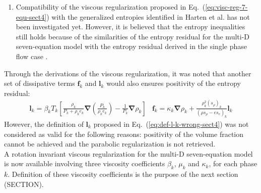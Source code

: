 \documentclass[preprint,10pt]{elsarticle}
\newcommand{\grad}{\mbold{\nabla}}
\newcommand{\mbold}[1]{\boldsymbol#1}
\newcommand{\eqt}[1]{Eq.~(\ref{#1})}                     %
\newcommand{\tcr}[1]{\textcolor{red}{#1}}
\newcommand{\tcb}[1]{\textcolor{blue}{#1}}
\begin{document}
\begin{enumerate}
\item{Compatibility of the viscous regularization proposed in \eqt{eq:visc-reg-7-equ-sect4} with the generalized entropies identified in Harten et al. \cite{Harten} has not been investigated yet. However, it is believed that the entropy inequalities still holds because of the similarities of the entropy residual for the multi-D seven-equation model with the entropy residual derived in the single phase flow case \cite{jlg}.} 
\end{enumerate}
%
Through the derivations of the viscous regularization, it was noted that another set of dissipative terms $\mbold f_k$ and $\mbold l_k$ would also ensures positivity of the entropy residual:
%
\begin{subequations}
\begin{align}\label{eq:def-l-k-wrong-sect4}
\mbold l_k =\beta_k T_k \left[ \frac{\rho_k}{P_k+\rho_k e_k} \grad \left( \frac{P_k}{\rho_k e_k} \right) - \frac{1}{P_k} \grad \rho_k \right]
\end{align}
\begin{align}
\mbold f_k = \kappa_k \grad \rho_k +  \frac{\rho^2_k (s_{\rho})_k}{\left( \rho s_{\rho} - e s_e \right)_k} \mbold l_k
\end{align}
\end{subequations}
%
However, the definition of $\mbold l_k$ proposed in \eqt{eq:def-l-k-wrong-sect4} was not considered as valid for the following reasons: positivity of the volume fraction cannot be achieved and the parabolic regularization is not retrieved.\\ 

A rotation invariant viscous regularization for the multi-D seven-equation model is now available involving three viscosity coefficients $\beta_k$, $\mu_k$ and $\kappa_k$, for each phase $k$. Definition of these viscosity coefficients is the purpose of the next section (SECTION).
%
\end{document}
